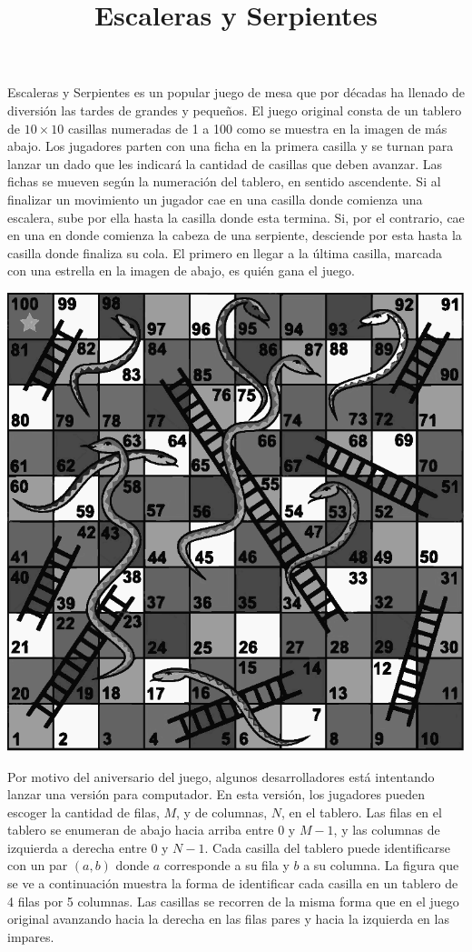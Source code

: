 \documentclass{oci}
\title{Escaleras y Serpientes}
\begin{document}
\begin{problemDescription}
  Escaleras y Serpientes es un popular juego de mesa que por décadas ha
  llenado de diversión las tardes de grandes y pequeños.
  El juego original consta de un tablero de $10\times 10$ casillas numeradas de
  1 a 100 como se muestra en la imagen de más abajo.
  Los jugadores parten con una ficha en la primera casilla y se turnan para
  lanzar un dado que les indicará la cantidad de casillas que deben avanzar.
  Las fichas se mueven según la numeración del tablero, en sentido ascendente.
  Si al finalizar un movimiento un jugador cae en una casilla donde comienza una
  escalera, sube por ella hasta la casilla donde esta termina.
  Si, por el contrario, cae en una en donde comienza la cabeza de una serpiente,
  desciende por esta hasta la casilla donde finaliza su cola.
  El primero en llegar a la última casilla, marcada con una estrella en la
  imagen de abajo, es quién gana el juego.

  \begin{center}
  \includegraphics[scale=0.8]{tablero}
  \end{center}

  Por motivo del aniversario del juego, algunos desarrolladores está intentando
  lanzar una versión para computador.
  En esta versión, los jugadores pueden escoger la cantidad de filas, $M$, y de
  columnas, $N$, en el tablero.
  Las filas en el tablero se enumeran de abajo hacia arriba entre 0 y $M-1$, y
  las columnas de izquierda a derecha entre 0 y $N-1$.
  Cada casilla del tablero puede identificarse con un par $(a, b)$ donde $a$
  corresponde a su fila y $b$ a su columna.
  La figura que se ve a continuación muestra la forma de identificar cada
  casilla en un tablero de 4 filas por 5 columnas.
  Las casillas se recorren de la misma forma que en el juego original avanzando
  hacia la derecha en las filas pares y hacia la izquierda en las impares.


\end{problemDescription}
\end{document}
